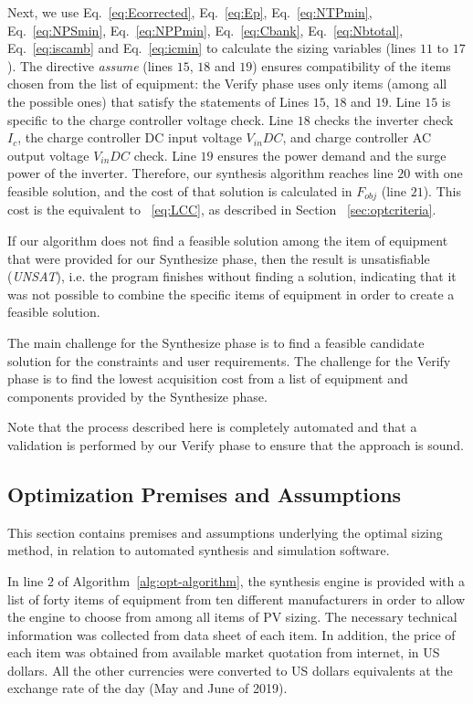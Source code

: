 Next, we use Eq.~\eqref{eq:Ecorrected}, Eq.~\eqref{eq:Ep}, Eq.~\eqref{eq:NTPmin}, Eq.~\eqref{eq:NPSmin}, Eq.~\eqref{eq:NPPmin}, Eq.~\eqref{eq:Cbank}, Eq.~\eqref{eq:Nbtotal}, Eq.~\eqref{eq:iscamb} and Eq.~\eqref{eq:icmin} to calculate the sizing variables (lines $11$ to $17$). The directive \textit{assume} (lines $15$, $18$ and $19$) 
ensures compatibility of the items chosen from the list of equipment: the {\sc Verify} phase uses only items (among all the possible ones) that satisfy the statements of Lines $15$, $18$ and $19$. Line $15$ is specific to the charge controller voltage check. Line $18$ checks the inverter check $I_{c}$, the charge controller DC input voltage $V_{in}DC$, and charge controller AC output voltage $V_{in}DC$ check. Line $19$ ensures the power demand and the surge power of the inverter.
Therefore, our synthesis algorithm reaches line $20$ with one feasible solution, and the cost of that solution is calculated in $F_{obj}$ (line $21$). This cost is the equivalent to ~\ref{eq:LCC}, as described in Section ~\ref{sec:optcriteria}.

If our algorithm does not find a feasible solution among the item of equipment that were provided for our {\sc Synthesize} phase,  then the result is unsatisfiable (\textit{UNSAT}), i.e. the program finishes without finding a solution, indicating that it was not possible to combine the specific items of equipment in order to create a feasible solution. 

The main challenge for the {\sc Synthesize} phase is to find a feasible candidate solution for the constraints and user requirements. The challenge for the {\sc Verify} phase is to find the lowest acquisition cost from a list of equipment and components provided by the {\sc Synthesize} phase. 

Note that the process described here is completely automated and that a validation is performed by our {\sc Verify} phase to ensure that the approach is sound.

\subsection{Optimization Premises and Assumptions}
\label{sec:OptAssumptions}

This section contains premises and assumptions underlying the optimal sizing method, in relation to automated synthesis and simulation software.

In line $2$ of Algorithm~\ref{alg:opt-algorithm}, the synthesis engine is provided with a list of forty items of equipment from ten different manufacturers in order to allow the engine to choose from among all items of PV sizing. The necessary technical information was collected from data sheet of each item. In addition, the price of each item was obtained from available market quotation from internet, in US dollars. All the other currencies were converted to US dollars equivalents at the exchange rate of the day (May and June of 2019).

